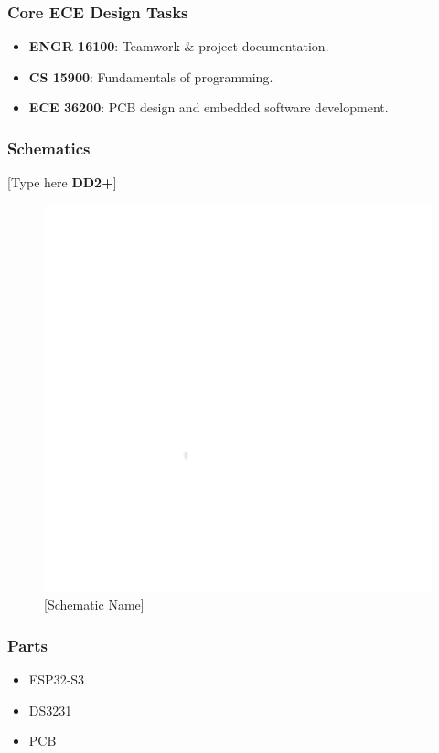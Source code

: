 \subsubsection{Core ECE Design Tasks}
\begin{itemize}
    \item \textbf{ENGR 16100}: Teamwork \& project documentation.
    \item \textbf{CS 15900}: Fundamentals of programming.
    \item \textbf{ECE 36200}: PCB design and embedded software development.
\end{itemize}

\subsubsection{Schematics}
[Type here \textbf{DD2+}]
\begin{figure}[h]
    \centering
    \includegraphics[width=16cm]{images/white.png} %
    \caption{[Schematic Name]}
\end{figure} %

\subsubsection{Parts}
\begin{itemize}
    \item ESP32-S3
    \item DS3231
    \item PCB
\end{itemize}

